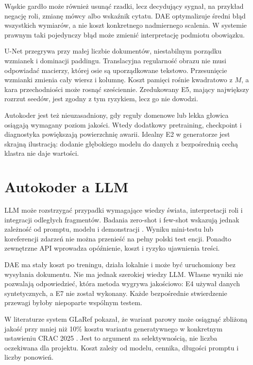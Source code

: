 Wąskie gardło może również usunąć rzadki, lecz decydujący sygnał, na przykład negację roli, zmianę mówcy albo wskaźnik cytatu. DAE optymalizuje średni błąd wszystkich wymiarów, a nie koszt konkretnego nadmiernego scalenia. W systemie prawnym taki pojedynczy błąd może zmienić interpretację podmiotu obowiązku.

U-Net przegrywa przy małej liczbie dokumentów, niestabilnym porządku wzmianek i dominacji paddingu. Translacyjna regularność obrazu nie musi odpowiadać macierzy, której osie są uporządkowane tekstowo. Przesunięcie wzmianki zmienia cały wiersz i kolumnę. Koszt pamięci rośnie kwadratowo z $M$, a kara przechodniości może rosnąć sześciennie. Zredukowany E5, mający największy rozrzut seedów, jest zgodny z tym ryzykiem, lecz go nie dowodzi.

Autokoder jest też nieuzasadniony, gdy reguły domenowe lub lekka głowica osiągają wymagany poziom jakości. Wtedy dodatkowy pretraining, checkpoint i diagnostyka powiększają powierzchnię awarii. Idealny E2 w generatorze jest skrajną ilustracją: dodanie głębokiego modelu do danych z bezpośrednią cechą klastra nie daje wartości.

\section{Autokoder a LLM}

LLM może rozstrzygać przypadki wymagające wiedzy świata, interpretacji roli i integracji odległych fragmentów. Badania zero-shot i few-shot wskazują jednak zależność od promptu, modelu i demonstracji \cite{gan_2024_llm_coref,sajid_2025_fewshot}. Wyniku mini-testu lub koreferencji zdarzeń nie można przenieść na pełny polski test encji. Ponadto zewnętrzne API wprowadza opóźnienie, koszt i ryzyko ujawnienia treści.

DAE ma stały koszt po treningu, działa lokalnie i może być uruchomiony bez wysyłania dokumentu. Nie ma jednak szerokiej wiedzy LLM. Własne wyniki nie pozwalają odpowiedzieć, która metoda wygrywa jakościowo: E4 używał danych syntetycznych, a E7 nie został wykonany. Każde bezpośrednie stwierdzenie przewagi byłoby niepoparte wspólnym testem.

W literaturze system GLaRef pokazał, że wariant parowy może osiągnąć zbliżoną jakość przy mniej niż 10\% kosztu wariantu generatywnego w konkretnym ustawieniu CRAC 2025 \cite{seminck_2025_glaref}. Jest to argument za selektywnością, nie liczba oczekiwana dla projektu. Koszt zależy od modelu, cennika, długości promptu i liczby ponowień.

